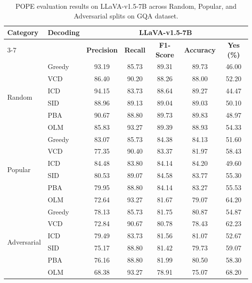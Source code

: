 \documentclass[11pt]{article}
\begin{document}
\setcounter{table}{8}

\begin{table}[ht]
\centering
\caption{POPE evaluation results on LLaVA-v1.5-7B across Random, Popular, and Adversarial splits on GQA dataset.}
\label{tab:pope_results_13b}

\setlength{\tabcolsep}{6pt}
\renewcommand{\arraystretch}{1.1}

\begin{tabular}{l|l|ccccc}
\toprule
\multirow{2}{*}{\textbf{Category}} &
\multirow{2}{*}{\textbf{Decoding}}
& \multicolumn{5}{c}{\textbf{LLaVA-v1.5-7B}} \\
\cmidrule(lr){3-7}
&
& \textbf{Precision}
& \textbf{Recall}
& \textbf{F1-Score}
& \textbf{Accuracy}
& \textbf{Yes (\%)} \\
\midrule

\multirow{6}{*}{Random}
& Greedy & 93.19 & 85.73 & 89.31 & 89.73 & 46.00 \\
& VCD    & 86.40 & 90.20 & 88.26 & 88.00 & 52.20 \\
& ICD    & 94.15 & 83.73 & 88.64 & 89.27 & 44.47 \\
& SID    & 88.96 & 89.13 & 89.04 & 89.03 & 50.10 \\
& PBA    & 90.67 & 88.80 & 89.73 & 89.83 & 48.97 \\
& OLM    & 85.83 & 93.27 & 89.39 & 88.93 & 54.33 \\
\midrule

\multirow{6}{*}{Popular}
& Greedy & 83.07 & 85.73 & 84.38 & 84.13 & 51.60 \\
& VCD    & 77.35 & 90.40 & 83.37 & 81.97 & 58.43 \\
& ICD    & 84.48 & 83.80 & 84.14 & 84.20 & 49.60 \\
& SID    & 80.53 & 89.07 & 84.58 & 83.77 & 55.30 \\
& PBA    & 79.95 & 88.80 & 84.14 & 83.27 & 55.53 \\
& OLM    & 72.64 & 93.27 & 81.67 & 79.07 & 64.20 \\
\midrule

\multirow{6}{*}{Adversarial}
& Greedy & 78.13 & 85.73 & 81.75 & 80.87 & 54.87 \\
& VCD    & 72.84 & 90.67 & 80.78 & 78.43 & 62.23 \\
& ICD    & 79.49 & 83.73 & 81.56 & 81.07 & 52.67 \\
& SID    & 75.17 & 88.80 & 81.42 & 79.73 & 59.07 \\
& PBA    & 76.16 & 88.80 & 81.99 & 80.50 & 58.30 \\
& OLM    & 68.38 & 93.27 & 78.91 & 75.07 & 68.20 \\
\bottomrule

\end{tabular}

\end{table}
\end{document}
